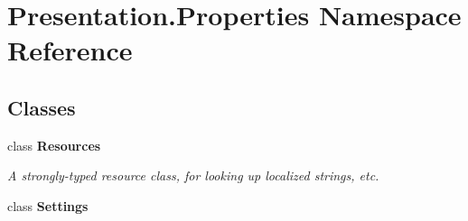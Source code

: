 \hypertarget{namespace_presentation_1_1_properties}{}\section{Presentation.\+Properties Namespace Reference}
\label{namespace_presentation_1_1_properties}
\subsection*{Classes}
\begin{DoxyCompactItemize}
\item 
class {\bfseries Resources}
\begin{DoxyCompactList}\small\item\em A strongly-\/typed resource class, for looking up localized strings, etc. \end{DoxyCompactList}\item 
class {\bfseries Settings}
\end{DoxyCompactItemize}
